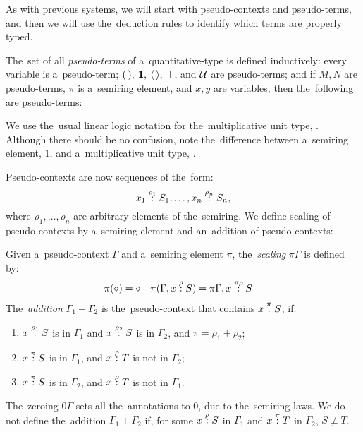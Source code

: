 
As with previous systems, we will start with pseudo-contexts and pseudo-terms,
and then we will use the~deduction rules to identify which terms are properly
typed.

\begin{definition}
  The~set of all \emph{pseudo-terms} of a~quantitative-type \lc is defined
  inductively: every variable is a~pseudo-term; $( \, ), \: \mathbf{1}, \: \langle \, \rangle,
  \: \top$, and $\mathcal{U}$ are pseudo-terms; and if $M, N$ are pseudo-terms, $\pi$
  is a~semiring element, and $x, y$ are variables, then the~following are
  pseudo-terms:
\end{definition}
We use the~usual linear logic notation for the~multiplicative unit type, \1.
Although there should be no confusion, note the~difference between a~semiring
element, $1$, and a~multiplicative unit type, \1.

Pseudo-contexts are now sequences of the~form:
\[
  x_1 \overset{\rho_1}: S_1, \dotsc, x_n \overset{\rho_n}: S_n,
\]
where $\rho_1, \dotsc, \rho_n$ are arbitrary elements of the~semiring. We define
scaling of pseudo-contexts by a~semiring element and an~addition of
pseudo-contexts:
\begin{definition}
  Given a~pseudo-context $\Gamma$ and a~semiring element $\pi$,
  the~\emph{scaling} $\pi\Gamma$ is defined by:
  \begin{align*}
    \pi (\diamond) = \diamond&  &  &\pi(\Gamma, x \overset{\rho}: S) = \pi\Gamma,
    x \overset{\pi\rho}: S
  \end{align*}
  The~\emph{addition} $\Gamma_1 + \Gamma_2$ is the~pseudo-context that contains
  $x \overset{\pi}: S$, if:
  \begin{enumerate}
    \item $x \overset{\rho_1}: S$ is in $\Gamma_1$ and $x \overset{\rho_2}: S$ is in
      $\Gamma_2$, and $\pi = \rho_1 + \rho_2$;
    \item $x \overset{\pi}: S$ is in $\Gamma_1$, and $x \overset{\rho}: T$ is not in $\Gamma_2$;
    \item $x \overset{\pi}: S$ is in $\Gamma_2$, and $x \overset{\rho}: T$ is not in $\Gamma_1$.
  \end{enumerate}
\end{definition}
The~zeroing $0\Gamma$ sets all the~annotations to $0$, due to the~semiring laws.
We do not define the~addition $\Gamma_1 + \Gamma_2$ if, for some $x \overset{\rho}: S$
in $\Gamma_1$ and $x \overset{\pi}: T$ in $\Gamma_2$, $S \not\equiv T$.


